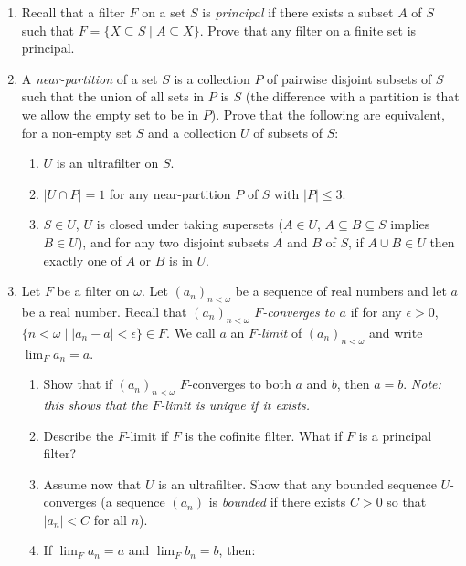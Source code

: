 \documentclass{amsart}
\theoremstyle{definition}
\begin{document}
\begin{enumerate}
\item
 Recall that a filter $F$ on a set $S$ is \emph{principal} if there exists a subset $A$ of $S$ such that $F = \{X \subseteq S \mid A \subseteq X\}$. Prove that any filter on a finite set is principal.


\item A \emph{near-partition} of a set $S$ is a collection $P$ of pairwise disjoint subsets of $S$ such that the union of all sets in $P$ is $S$ (the difference with a partition is that we allow the empty set to be in $P$). Prove that the following are equivalent, for a non-empty set $S$ and a collection $U$ of subsets of $S$:

  \begin{enumerate}
  \item $U$ is an ultrafilter on $S$.
  \item $|U \cap P| = 1$ for any near-partition $P$ of $S$ with $|P| \le 3$.
  \item $S \in U$, $U$ is closed under taking supersets ($A \in U$, $A \subseteq B \subseteq S$ implies $B \in U$), and for any two disjoint subsets $A$ and $B$ of $S$, if $A \cup B \in U$ then exactly one of $A$ or $B$ is in $U$.
  \end{enumerate}
  
\item Let $F$ be a filter on $\omega$. Let $(a_n)_{n < \omega}$ be a sequence of real numbers and let $a$ be a real number. Recall that $(a_n)_{n < \omega}$ \emph{$F$-converges to $a$} if for any $\epsilon > 0$, $\{n < \omega \mid |a_n - a| < \epsilon\} \in F$. We call $a$ an \emph{$F$-limit} of $(a_n)_{n < \omega}$ and write $\lim_F a_n = a$.

  \begin{enumerate}
  \item Show that if $(a_n)_{n < \omega}$ $F$-converges to both $a$ and $b$, then $a = b$. \emph{Note: this shows that the $F$-limit is unique if it exists.}
  \item Describe the $F$-limit if $F$ is the cofinite filter. What if $F$ is a principal filter?
  \item Assume now that $U$ is an ultrafilter. Show that any bounded sequence $U$-converges (a sequence $(a_n)$ is \emph{bounded} if there exists $C > 0$ so that $|a_n| < C$ for all $n$).
  \item If $\lim_{F} a_n = a$ and $\lim_F b_n = b$, then:


\end{enumerate}
\end{enumerate}
\end{document}

